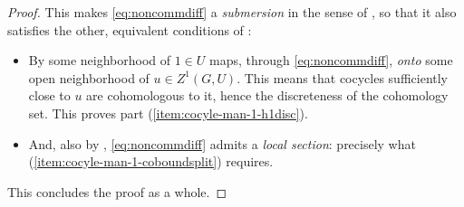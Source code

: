 \begin{proof}
 This makes \eqref{eq:noncommdiff} a {\it submersion} in the sense of \cite[Section~5.9.1\,(i)]{bourb-vars-17}, so that it also satisfies the other, equivalent conditions of \cite[Section~5.9.1]{bourb-vars-17}:
 \begin{itemize}\itemsep=0pt
 \item By \cite[Section~5.9.1\,(iv)]{bourb-vars-17} some neighborhood of $1\in U$ maps, through \eqref{eq:noncommdiff}, {\it onto} some open neighborhood of $u\in Z^1(G,U)$. This means that cocycles sufficiently close to $u$ are cohomologous to it, hence the discreteness of the cohomology set. This proves part (\ref{item:cocyle-man-1-h1disc}).
 \item And, also by \cite[Section~5.9.1\,(iv)]{bourb-vars-17}, \eqref{eq:noncommdiff} admits a {\it local section}: precisely what (\ref{item:cocyle-man-1-coboundsplit}) requires.
 \end{itemize}
 This concludes the proof as a whole.
\end{proof}
